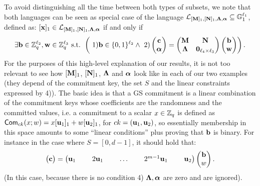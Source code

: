  To avoid distinguishing all the time between both types of subsets, we note that both languages can be seen as special case of the language 
 $\mathcal{L}_{[\mathbf{{M}}]_1,[\mathbf{{N}}]_1,\mathbf{{\Lambda}},{\boldsymbol \alpha}}\subseteq\mathbb{G}_1^{\ell_1}$, defined as: 
$[\mathbf{x}]_1\in\mathcal{L}_{[\mathbf{{M}}]_1,[\mathbf{{N}}]_1,\mathbf{{\Lambda}},{\boldsymbol \alpha}}$ if and only if 
\vspace{-0.2cm}
\begin{eqnarray*}
\exists \mathbf{b}\in \mathbb{Z}_q^{\ell_2},\mathbf{w}\in\mathbb{Z}_q^{\ell_3} \text{ s.t. }
\left( \ 1) \mathbf{b}\in \{0,1\}^{\ell_2}
  \wedge \ 2)
\left(\begin{matrix}
    \mathbf{c}\\
    {\boldsymbol \alpha}
\end{matrix}\right)
=
\begin{pmatrix}
    \mathbf{{M}}       & \mathbf{{N}}\\
    \mathbf{{\Lambda}} & \mathbf{{0}}_{{\ell_4}\times {\ell_3}}
\end{pmatrix}
\left(\begin{matrix}
    \mathbf{b}\\
    \mathbf{w}
\end{matrix}\right)\right).
\end{eqnarray*}
For the purposes of this high-level explanation of our results, it is not too relevant to see how $[\mathbf{{M}}]_1$, $[\mathbf{{N}}]_1$, $\mathbf{{\Lambda}}$ and ${\boldsymbol \alpha}$ look like in each of our two examples (they depend of the commitment key, the set $S$ and the linear constraints expressed by 4)). The basic idea is that a GS commitment is a linear combination of the commitment keys whose coefficients are the randomness and the committed values, i.e.  
a commitment to a scalar $x \in \mathbb{Z}_q$ is defined as $\mathsf{Com}_{ck}(x;w)=x [\mathbf{u}_1]_1+w [\mathbf{u}_2]_1$, for $ck=(\mathbf{u}_1,\mathbf{u}_2)$, so essentially membership in this space amounts to some ``linear conditions'' plus proving that $\mathbf{b}$ is binary. For instance in the case where $S=[0,d-1]$, it should hold that:
\vspace{-0.2cm}
$$
\left(\begin{matrix}
    \mathbf{c}
\end{matrix}\right)
=
\begin{pmatrix}
    \mathbf{u}_1 & \ &2 \mathbf{u}_1  &   \ & \ldots    & \  &  2^{m-1} \mathbf{u}_1& \ &  \mathbf{u}_2
\end{pmatrix}
\left(\begin{matrix}
    \mathbf{b}\\
    w
\end{matrix}\right).
 $$
 \vspace{-0.2cm}
(In this case, because there is no condition 4) $\mathbf{{\Lambda}}, {\boldsymbol \alpha}$ are zero and are ignored).


